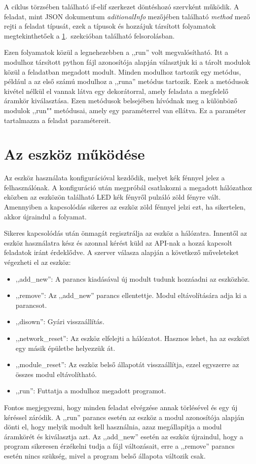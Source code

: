 \documentclass{thesis-ekf}
\theoremstyle{definition}
\theoremstyle{remark}
\begin{document}
	 A ciklus törzsében található if-elif szerkezet döntéshozó szervként működik. A feladat, mint JSON dokumentum \textit{aditionalInfo} mezőjében található \textit{method} mező rejti a feladat típusát, ezek a típusok és hozzájuk társított folyamatok megtekinthetőek a \ref{sec_mukodes}.~szekcióban található felsorolásban.
	 
	 Ezen folyamatok közül a legnehezebben a ,,run'' volt megvalósítható. Itt a modulhoz társított python fájl azonosítója alapján választjuk ki a tárolt modulok közül a feladatban megadott modult. Minden modulhoz tartozik egy metódus, például a az első számú modulhoz a ,,runa'' metódus tartozik. Ezek a metódusok kivétel nélkül el vannak látva egy dekorátorral, amely feladata a megfelelő áramkör kiválasztása. Ezen metódusok belsejében hívódnak meg a különböző modulok ,,run"" metódusai, amely egy paraméterrel van ellátva. Ez a paraméter tartalmazza a feladat paramétereit.
	 
	 
	 
	 \section{Az eszköz működése}
	 \label{sec_mukodes}
	 Az eszköz használata konfigurációval kezdődik, melyet kék fénnyel jelez a felhasználónak. A konfiguráció után megpróbál csatlakozni a megadott hálózathoz eközben az eszközön található LED kék fényről pulzáló zöld fényre vált. Amennyiben a kapcsolódás sikeres az eszköz zöld fénnyel jelzi ezt, ha sikertelen, akkor újraindul a folyamat.
	 
	 Sikeres kapcsolódás után önmagát regisztrálja az eszköz a hálózatra. Innentől az eszköz használatra kész és azonnal kérést küld az API-nak a hozzá kapcsolt feladatok iránt érdeklődve. A szerver válasza alapján a következő műveleteket végezheti el az eszköz:
	 \begin{itemize}
	 	
	 	\item ,,add\_new'': A parancs kiadásával új modult tudunk hozzáadni az eszközhöz.
	 	\item ,,remove'': Az ,,add\_new'' parancs ellentettje. Modul eltávolítására adja ki a parancsot.
	 	\item ,,disown'': Gyári visszaállítás.
	 	\item ,,network\_reset'': Az eszköz elfelejti a hálózatot. Hasznos lehet, ha az eszközt egy másik épületbe helyezzük át.
	 	\item ,,module\_reset'': Az eszköz belső állapotát visszaállítja, ezzel egyszerre az összes modul eltávolítható.
	 	\item ,,run'': Futtatja a modulhoz megadott programot.
	 \end{itemize}
	 Fontos megjegyezni, hogy minden feladat elvégzése annak törlésével és egy új kéréssel záródik. A ,,run'' parancs esetén az eszköz a modul azonosítója alapján dönti el, hogy melyik modult kell használnia, azaz megállapítja a modul áramkörét és kiválasztja azt. Az ,,add\_new'' esetén az eszköz újraindul, hogy a program sikeresen érzékelni tudja a fájl változásait, erre a ,,remove'' parancs esetén nincs szükség, mivel a program belső állapota változik csak.
	 
\end{document}
